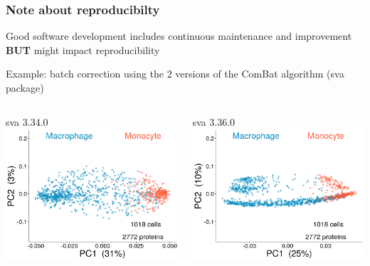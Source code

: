 \documentclass{beamer}
\newcommand{\hcode}[2][lgray]{{\ttfamily\color{vdgray}\colorbox{#1}{#2}}}
\newcommand{\frametitlesection}[1]{\frametitle{\centering #1 \footnotesize \hspace{0pt plus 1 filll} \insertsection}}
\begin{document}
\begin{frame}
    \frametitlesection{Note about reproducibilty}

    \small
    
    Good software development includes continuous maintenance and improvement 
    \textbf{BUT} might impact reproducibility
    
    \bigskip

    Example: batch correction using the 2 versions of the \hcode{ComBat} 
    algorithm (\hcode{sva} package)

    \bigskip

    \begin{columns}
        \scriptsize
        \centering
        \begin{column}{0.5\textwidth}
            \hcode{sva 3.34.0}
            \includegraphics[width=\textwidth]{figs/CombatOld.png}
        \end{column}
        \begin{column}{0.5\textwidth}
            \hcode{sva 3.36.0}
            \includegraphics[width=\textwidth]{figs/CombatNew.png}
        \end{column}
    \end{columns}


\end{frame}
\end{document}
